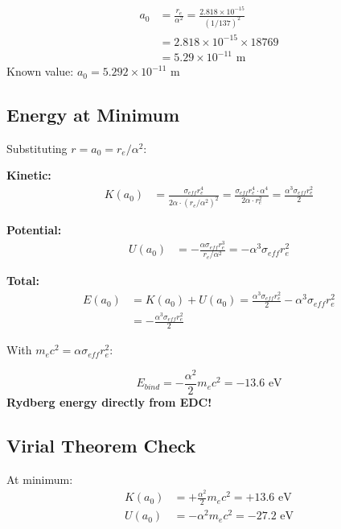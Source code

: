 \documentclass[12pt,a4paper]{article}
\begin{document}
\begin{numericalcheck}
\begin{align*}
a_0 &= \frac{r_e}{\alpha^2} = \frac{2.818 \times 10^{-15}}{(1/137)^2} \\
&= 2.818 \times 10^{-15} \times 18769 \\
&= 5.29 \times 10^{-11} \text{ m}
\end{align*}
Known value: $a_0 = 5.292 \times 10^{-11}$ m \checkmark
\end{numericalcheck}

\subsection{Energy at Minimum}

Substituting $r = a_0 = r_e/\alpha^2$:

\textbf{Kinetic:}
\begin{align}
K(a_0) &= \frac{\sigma_{eff} r_e^4}{2\alpha \cdot (r_e/\alpha^2)^2} = \frac{\sigma_{eff} r_e^4 \cdot \alpha^4}{2\alpha \cdot r_e^2} = \frac{\alpha^3 \sigma_{eff} r_e^2}{2}
\end{align}

\textbf{Potential:}
\begin{align}
U(a_0) &= -\frac{\alpha \sigma_{eff} r_e^3}{r_e/\alpha^2} = -\alpha^3 \sigma_{eff} r_e^2
\end{align}

\textbf{Total:}
\begin{align}
E(a_0) &= K(a_0) + U(a_0) = \frac{\alpha^3 \sigma_{eff} r_e^2}{2} - \alpha^3 \sigma_{eff} r_e^2 \\
&= -\frac{\alpha^3 \sigma_{eff} r_e^2}{2}
\end{align}

With $m_e c^2 = \alpha \sigma_{eff} r_e^2$:

\begin{keyresult}
\begin{equation}
\boxed{E_{bind} = -\frac{\alpha^2}{2} m_e c^2 = -13.6 \text{ eV}}
\end{equation}
\textbf{Rydberg energy directly from EDC!}
\end{keyresult}

\subsection{Virial Theorem Check}

At minimum:
\begin{align}
K(a_0) &= +\frac{\alpha^2}{2} m_e c^2 = +13.6 \text{ eV} \\
U(a_0) &= -\alpha^2 m_e c^2 = -27.2 \text{ eV}
\end{align}
\end{document}
